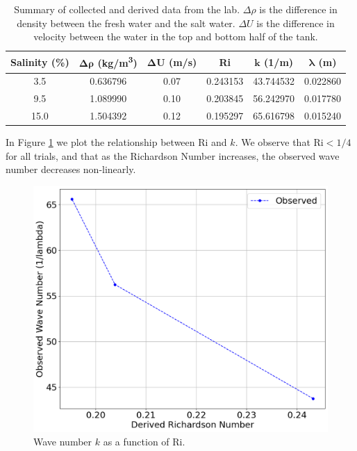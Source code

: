 \documentclass{article}
\begin{document}
\begin{table}[h!]
    \centering
    \begin{tabular}{|c|c|c|c|c|c|}
    \hline
    \textbf{Salinity (\%)} & $\bm{\Delta \rho}$ \textbf{(kg/m\textsuperscript{3})} & $\bm{\Delta U}$ \textbf{(m/s)}& \textbf{Ri} & $\bm{k}$ \textbf{(1/m)}& $\bm{\lambda}$ \textbf{(m)}\\ \hline
    3.5 & 0.636796 & 0.07 & 0.243153 & 43.744532 & 0.022860 \\
    9.5 & 1.089990 & 0.10 & 0.203845 & 56.242970 & 0.017780 \\
    15.0 & 1.504392 & 0.12 & 0.195297 & 65.616798 & 0.015240 \\
    \hline
    \end{tabular}
    \caption{Summary of collected and derived data from the lab. \(\Delta \rho\) is the difference in density between the fresh water and the salt water. \(\Delta U\) is the difference in velocity between the water in the top and bottom half of the tank.}
    \label{tab:data}
\end{table}

In Figure \ref{graph:Ri-vs-k} we plot the relationship between Ri and \(k\). We
observe that \(\text{Ri} < 1/4\) for all trials, and that as the Richardson
Number increases, the observed wave number decreases non-linearly.

\begin{figure}[h!]
    \centering
    \includegraphics[width=5in]{RivsK.png}
    \caption{Wave number $k$ as a function of Ri.}
    \label{graph:Ri-vs-k}
\end{figure}
\end{document}
